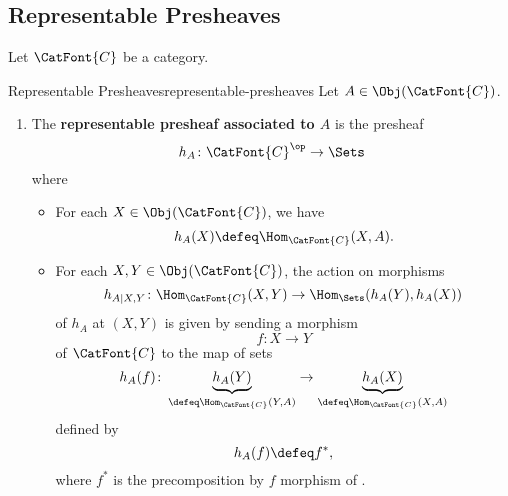 \subsection{Representable Presheaves}\label{subsection-representable-presheaves}
Let $\CatFont{C}$ be a category.
\begin{definition}{Representable Presheaves}{representable-presheaves}%
    Let $A\in\Obj(\CatFont{C})$.
    \begin{enumerate}
        \item\label{representable-presheaves-representable-presheaves-associated-to-an-object}The \textbf{representable presheaf associated to $A$} is the presheaf 
            \[
                h_{A}%
                \colon%
                \CatFont{C}^{\op}%
                \to%
                \Sets%
            \]%
            where
            \begin{itemize}
                \item{}For each $X\in\Obj(\CatFont{C})$, we have
                    \[
                        h_{A}(X)
                        \defeq
                        \Hom_{\CatFont{C}}(X,A).
                    \]%
                \item{}For each $X,Y\in\Obj(\CatFont{C})$, the action on morphisms
                    \[
                        h_{A|X,Y}%
                        \colon%
                        \Hom_{\CatFont{C}}(X,Y)%
                        \to%
                        \Hom_{\Sets}(h_{A}(Y),h_{A}(X))%
                    \]%
                    of $h_{A}$ at $(X,Y)$ is given by sending a morphism
                    \[
                        f%
                        \colon%
                        X%
                        \to%
                        Y%
                    \]%
                    of $\CatFont{C}$ to the map of sets
                    \[
                        h_{A}(f)
                        \colon
                        \underbrace{h_{A}(Y)}_{\defeq\Hom_{\CatFont{C}}(Y,A)}
                        \to
                        \underbrace{h_{A}(X)}_{\defeq\Hom_{\CatFont{C}}(X,A)}
                    \]%
                    defined by
                    \[
                        h_{A}(f)
                        \defeq
                        f^{*},
                    \]%
                    where $f^{*}$ is the precomposition by $f$ morphism of .

\end{itemize}
\end{enumerate}
\end{definition}

